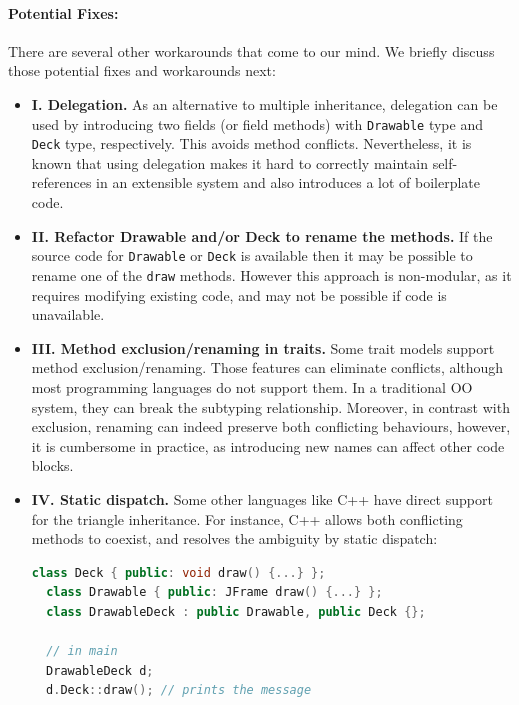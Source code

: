 \paragraph{{\bf Potential Fixes:}}
There are several other workarounds
that come to our mind. We briefly discuss those potential fixes and
workarounds next:
\begin{itemize}
  \item \textbf{I. Delegation.} As an alternative to multiple inheritance,
  delegation can be used by introducing two fields (or field methods) with
  \lstinline|Drawable| type and \lstinline|Deck| type,
  respectively. This avoids method conflicts. Nevertheless, it is known
  that using delegation makes it hard to correctly maintain
  self-references in an extensible system and also
  introduces a lot of boilerplate code.
  \item \textbf{II. Refactor Drawable and/or Deck to rename the methods.} If
  the source code for \lstinline|Drawable| or \lstinline|Deck| is available
  then it may be possible to rename one of the \lstinline|draw|
  methods. However this approach is non-modular, as it requires 
  modifying existing code, and may not be possible if code is unavailable.
  \item \textbf{III. Method exclusion/renaming in traits.} Some trait models
  support method exclusion/renaming. Those features
   can eliminate conflicts, although most
  programming languages do not support them. In a traditional OO system,
  they can break the subtyping relationship. Moreover, in
  contrast with exclusion, renaming can indeed preserve both conflicting
  behaviours, however, it is cumbersome in practice, as introducing new
  names can affect other code blocks.
  \item \textbf{IV. Static dispatch.} Some other languages like C++ have
  direct support for the triangle inheritance. For instance, C++ allows both
  conflicting methods to coexist, and resolves the ambiguity by static dispatch:
  \vspace{3pt}\begin{lstlisting}[language=c++]
  class Deck { public: void draw() {...} };
  class Drawable { public: JFrame draw() {...} };
  class DrawableDeck : public Drawable, public Deck {};
  
  // in main
  DrawableDeck d;
  d.Deck::draw(); // prints the message
  \end{lstlisting}\vspace{3pt}
\end{itemize}

